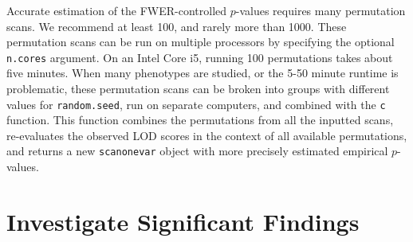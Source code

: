 \documentclass[9pt,twocolumn,twoside]{gsag3jnl}
\begin{document}
Accurate estimation of the FWER-controlled $p$-values requires many permutation scans.
We recommend at least 100, and rarely more than 1000.
These permutation scans can be run on multiple processors by specifying the optional \texttt{n.cores} argument.
On an Intel Core i5, running 100 permutations takes about five minutes.
When many phenotypes are studied, or the 5-50 minute runtime is problematic, these permutation scans can be broken into groups with different values for \texttt{random.seed}, run on separate computers, and combined with the \texttt{c} function.
This function combines the permutations from all the inputted scans, re-evaluates the observed LOD scores in the context of all available permutations, and returns a new \texttt{scanonevar} object with more precisely estimated empirical $p$-values.






\section*{Investigate Significant Findings}
\end{document}
